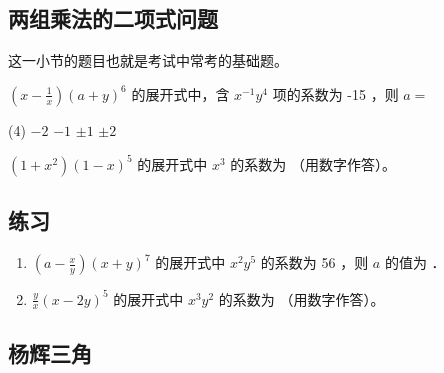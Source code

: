 \subsection{两组乘法的二项式问题}

这一小节的题目也就是考试中常考的基础题。

\vspace{0.4cm}

\begin{example}
    $\left(x-\frac{1}{x}\right)(a+y)^{6}$ 的展开式中，含 $x^{-1} y^{4}$ 项的系数为 -15 ，则 $a=$
    \begin{tasks}(4)
        \task $-2$
        \task $-1$
        \task $\pm 1$
        \task $\pm 2$
    \end{tasks}
\end{example}

\begin{example}
    $\left(1+x^{2}\right)(1-x)^{5}$ 的展开式中 $x^{3}$ 的系数为 \underline{\hspace{2cm}} （用数字作答）。
\end{example}

\subsection*{练习}

\begin{enumerate}

    \item $\left(a-\frac{x}{y}\right)(x+y)^{7}$ 的展开式中 $x^{2} y^{5}$ 的系数为 56 ，则 $a$ 的值为 \underline{\hspace{2cm}} ．

    \item $\frac{y}{x}(x-2 y)^{5}$ 的展开式中 $x^{3} y^{2}$ 的系数为 \underline{\hspace{2cm}} （用数字作答）。

\end{enumerate}

\subsection{杨辉三角}

